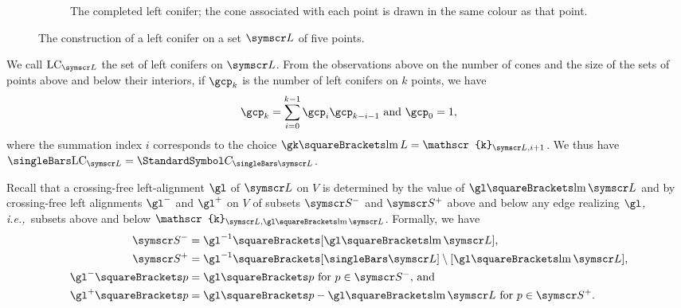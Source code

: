 \documentclass[10pt, a4paper, twoside]{basestyle}
\newcommand{\idest}{\emph{, i.e.,\ }}
\DeclareMathOperator{\leftmost}{lm}
\newcommand{\LC}[1]{\mathrm{LC}_{#1}}
\newcommand{\CatalanNumber}[1]{\StandardSymbol C_{#1}}
\newcommand{\pointset}{\symscr}
\newcommand{\lcone}[1]{\mathscr{k}_{\pointset L, #1}}
\begin{document}
\begin{figure}[ht!]
\begin{subfigure}{.45\textwidth}
  \caption{The completed left conifer; the cone associated with each point is drawn in the same colour
  as that point.}
\end{subfigure}
\caption{The construction of a left conifer on a set $\pointset L$ of five points.}
\label{figLeftConifer}
\end{figure}

We call $\LC {\pointset L}$ the set of left conifers on $\pointset L$. From the observations above on the number
of cones and the
size of the sets of points above and below their interiors, if $\gcp_k$ is the number of left conifers on $k$ points,
we have
\[
\gcp_k=\sum{i=0}[k-1]\gcp_{i}\gcp_{k-i-1} \text{ and } \gcp_0=1\text,
\]
where the summation index $i$ corresponds to the choice $\gk\of{\leftmost L}=\lcone {i+1}$.
We thus have $\Cardinality{\LC {\pointset L}} = \CatalanNumber {\Cardinality{\pointset L}}$.

Recall that a crossing-free left-alignment $\gl$ of $\pointset L$ on $V$
is determined by the value of $\gl\of{\leftmost\pointset L}$ and by
crossing-free left alignments $\gl^-$ and $\gl^+$ on $V$
of subsets $\pointset S^-$ and $\pointset S^+$ above and below any edge
realizing $\gl$\idest subsets above and below $\lcone{\gl\of{\leftmost\pointset L}}$.
Formally, we have
\begin{align*}
\pointset S^- &= \gl^{-1}\of{[\gl\of{\leftmost\pointset L}]}\text,\\
\pointset S^+ &= \gl^{-1}\of{[\Cardinality{\pointset L}]\setminus[\gl\of{\leftmost\pointset L}]}\text,\\
\gl^-\of{p} &= \gl\of{p} \text{ for $p\in\pointset S^-$, and}\\
\gl^+\of{p} &= \gl\of{p}-\gl\of{\leftmost\pointset L} \text{ for $p\in\pointset S^+$.}
\end{align*}
\end{document}
